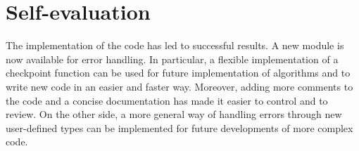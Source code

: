 \documentclass[pra, onecolumn, notitlepage, floats, 11pt]{revtex4-1}
\begin{document}
\section{Self-evaluation}
The implementation of the code has led to successful results. A new module is now available for error handling. In particular, a flexible implementation of a checkpoint function can be used for future implementation of algorithms and to write new code in an easier and faster way. Moreover, adding more comments to the code and a concise documentation has made it easier to control and to review. On the other side, a more general way of handling errors through new user-defined types can be implemented for future developments of more complex code.
\end{document}
